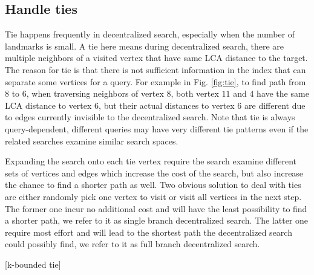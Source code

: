 \subsection{Handle ties}

Tie happens frequently in decentralized search, especially when the number of landmarks is small. A tie here means during decentralized search, there are multiple neighbors of a visited vertex that have same LCA distance to the target. The reason for tie is that there is not sufficient information in the index that can separate some vertices for a query. For example in Fig. \ref{fig:tie}, to find path from $8$ to $6$, when traversing neighbors of vertex $8$, both vertex $11$ and $4$ have the same LCA distance to vertex $6$, but their actual distances to vertex $6$ are different due to edges currently invisible to the decentralized search. Note that tie is always query-dependent, different queries may have very different tie patterns even if the related searches examine similar search spaces. 

Expanding the search onto each tie vertex require the search examine different sets of vertices and edges which increase the cost of the search, but also increase the chance to find a shorter path as well. Two obvious solution to deal with ties are either randomly pick one vertex to visit or visit all vertices in the next step. The former one incur no additional cost and will have the least possibility to find a shorter path, we refer to it as single branch decentralized search. The latter one require most effort and will lead to the shortest path the decentralized search could possibly find, we refer to it as full branch decentralized search.

[k-bounded tie]
